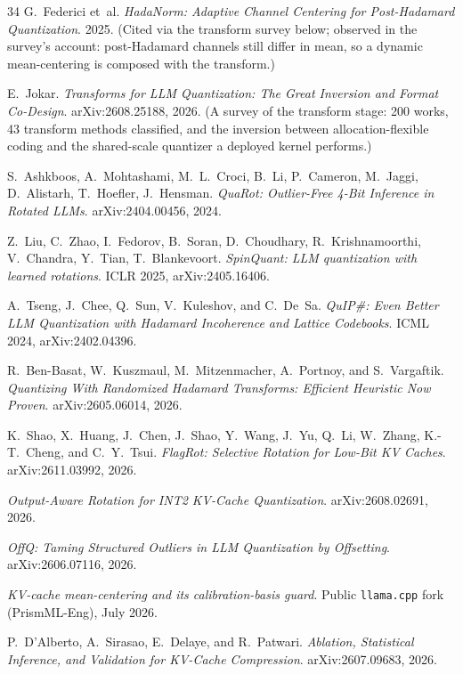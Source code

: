 \documentclass[10pt,twocolumn]{article}
\begin{document}
\begin{thebibliography}{34}
G.~Federici et~al.
\emph{HadaNorm: Adaptive Channel Centering for Post-Hadamard Quantization}.
2025. (Cited via the transform survey below; observed in the survey's account: post-Hadamard channels still differ in mean, so a dynamic mean-centering is composed with the transform.)

E.~Jokar.
\emph{Transforms for LLM Quantization: The Great Inversion and Format Co-Design}.
arXiv:2608.25188, 2026. (A survey of the transform stage: 200 works, 43 transform methods classified, and the inversion between allocation-flexible coding and the shared-scale quantizer a deployed kernel performs.)

S.~Ashkboos, A.~Mohtashami, M.~L.~Croci, B.~Li, P.~Cameron, M.~Jaggi, D.~Alistarh, T.~Hoefler, J.~Hensman.
\emph{QuaRot: Outlier-Free 4-Bit Inference in Rotated LLMs}.
arXiv:2404.00456, 2024.

Z.~Liu, C.~Zhao, I.~Fedorov, B.~Soran, D.~Choudhary, R.~Krishnamoorthi, V.~Chandra, Y.~Tian, T.~Blankevoort.
\emph{SpinQuant: LLM quantization with learned rotations}.
ICLR 2025, arXiv:2405.16406.

A.~Tseng, J.~Chee, Q.~Sun, V.~Kuleshov, and C.~De~Sa.
\emph{QuIP\#: Even Better LLM Quantization with Hadamard Incoherence and Lattice Codebooks}.
ICML 2024, arXiv:2402.04396.

R.~Ben-Basat, W.~Kuszmaul, M.~Mitzenmacher, A.~Portnoy, and S.~Vargaftik.
\emph{Quantizing With Randomized Hadamard Transforms: Efficient Heuristic Now Proven}.
arXiv:2605.06014, 2026.

K.~Shao, X.~Huang, J.~Chen, J.~Shao, Y.~Wang, J.~Yu, Q.~Li, W.~Zhang, K.-T.~Cheng, and C.~Y.~Tsui.
\emph{FlagRot: Selective Rotation for Low-Bit KV Caches}.
arXiv:2611.03992, 2026.

\emph{Output-Aware Rotation for INT2 KV-Cache Quantization}.
arXiv:2608.02691, 2026.

\emph{OffQ: Taming Structured Outliers in LLM Quantization by Offsetting}.
arXiv:2606.07116, 2026.

\emph{KV-cache mean-centering and its calibration-basis guard}.
Public \texttt{llama.cpp} fork (PrismML-Eng), July 2026.

P.~D'Alberto, A.~Sirasao, E.~Delaye, and R.~Patwari.
\emph{Ablation, Statistical Inference, and Validation for KV-Cache Compression}.
arXiv:2607.09683, 2026.


\end{thebibliography}
\end{document}
